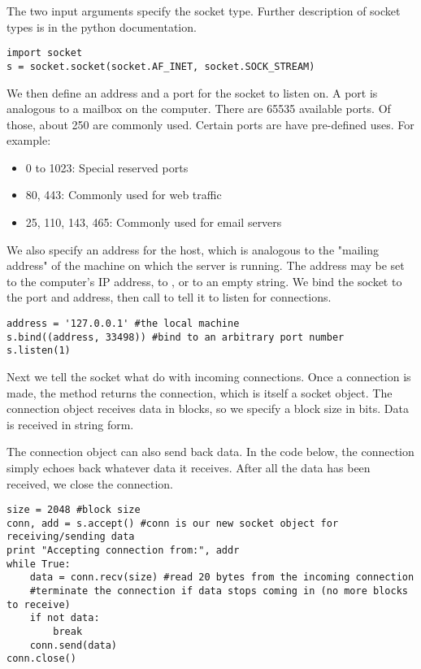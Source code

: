 The two input arguments specify the socket type. Further description of socket types is in the python documentation.

\begin{lstlisting}
import socket
s = socket.socket(socket.AF_INET, socket.SOCK_STREAM)
\end{lstlisting}

We then define an address and a port for the socket to listen on.
A port is analogous to a mailbox on the computer.
There are 65535 available ports.
Of those, about 250 are commonly used.
Certain ports are have pre-defined uses. For example:
\begin{itemize}  
        \item 0 to 1023: Special reserved ports
        \item  80, 443: Commonly used for web traffic
        \item 25, 110, 143, 465: Commonly used for email servers
    \end{itemize}
We also specify an address for the host, which is analogous to the "mailing address" of the machine on which the server is running.
The address may be set to the computer's IP address, to , or to an empty string. We bind the socket to the port and address, then call  to tell it to listen for connections.


\begin{lstlisting}
address = '127.0.0.1' #the local machine
s.bind((address, 33498)) #bind to an arbitrary port number
s.listen(1)
\end{lstlisting}

Next we tell the socket what do with incoming connections. 
Once a connection is made, the  method returns the connection, which is itself a socket object.
The connection object receives data in blocks, so we specify a block size in bits.
Data is received in string form.

The connection object can also send back data.
In the code below, the connection simply echoes back whatever data it receives.
After all the data has been received, we close the connection.


\begin{lstlisting}
size = 2048 #block size
conn, add = s.accept() #conn is our new socket object for receiving/sending data
print "Accepting connection from:", addr
while True:
	data = conn.recv(size) #read 20 bytes from the incoming connection
	#terminate the connection if data stops coming in (no more blocks to receive)
	if not data:
		break
	conn.send(data)
conn.close()
\end{lstlisting}

